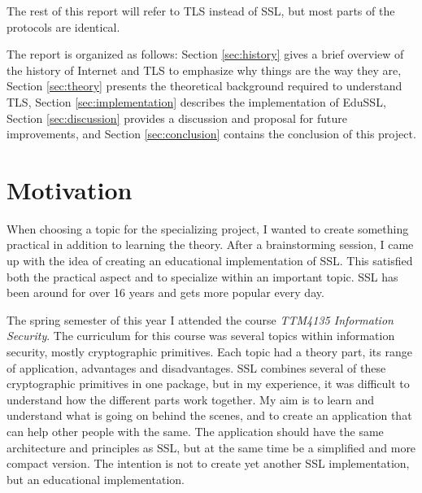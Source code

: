 \documentclass[12pt,a4paper,titlepage]{report}
\begin{document}
The rest of this report will refer to TLS instead of SSL, but most parts of the protocols are identical.

The report is organized as follows: Section \ref{sec:history} gives a brief overview of the history of Internet and TLS to emphasize why things are the way they are, Section \ref{sec:theory} presents the theoretical background required to understand TLS, Section \ref{sec:implementation} describes the implementation of EduSSL, Section \ref{sec:discussion} provides a discussion and proposal for future improvements, and Section \ref{sec:conclusion} contains the conclusion of this project.

\section{Motivation}
When choosing a topic for the specializing project, I wanted to create something practical in addition to learning the theory. After a brainstorming session, I came up with the idea of creating an educational implementation of SSL. This satisfied both the practical aspect and to specialize within an important topic. SSL has been around for over 16 years and gets more popular every day.

The spring semester of this year I attended the course \emph{TTM4135 Information Security}. The curriculum for this course was several topics within information security, mostly cryptographic primitives. Each topic had a theory part, its range of application, advantages and disadvantages.  SSL combines several of these cryptographic primitives in one package, but in my experience, it was difficult to understand how the different parts work together. 
My aim is to learn and understand what is going on behind the scenes, and to create an application that can help other people with the same. The application should have the same architecture and principles as SSL, but at the same time be a simplified and more compact version. The intention is not to create yet another SSL implementation, but an educational implementation. 
\end{document}
